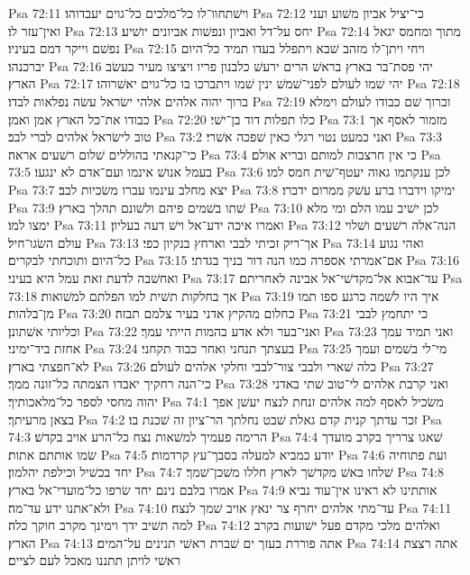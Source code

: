 Psa 72:11  וישׁתחוו־לו כל־מלכים כל־גוים יעבדוהו׃
Psa 72:12  כי־יציל אביון משׁוע ועני ואין־עזר לו׃
Psa 72:13  יחס על־דל ואביון ונפשׁות אביונים יושׁיע׃
Psa 72:14  מתוך ומחמס יגאל נפשׁם וייקר דמם בעיניו׃
Psa 72:15  ויחי ויתן־לו מזהב שׁבא ויתפלל בעדו תמיד כל־היום יברכנהו׃
Psa 72:16  יהי פסת־בר בארץ בראשׁ הרים ירעשׁ כלבנון פריו ויציצו מעיר כעשׂב הארץ׃
Psa 72:17  יהי שׁמו לעולם לפני־שׁמשׁ ינין שׁמו ויתברכו בו כל־גוים יאשׁרוהו׃
Psa 72:18  ברוך יהוה אלהים אלהי ישׂראל עשׂה נפלאות לבדו׃
Psa 72:19  וברוך שׁם כבודו לעולם וימלא כבודו את־כל הארץ אמן ואמן׃
Psa 72:20  כלו תפלות דוד בן־ישׁי׃
Psa 73:1  מזמור לאסף אך טוב לישׂראל אלהים לברי לבב׃
Psa 73:2  ואני כמעט נטוי רגלי כאין שׁפכה אשׁרי׃
Psa 73:3  כי־קנאתי בהוללים שׁלום רשׁעים אראה׃
Psa 73:4  כי אין חרצבות למותם ובריא אולם׃
Psa 73:5  בעמל אנושׁ אינמו ועם־אדם לא ינגעו׃
Psa 73:6  לכן ענקתמו גאוה יעטף־שׁית חמס למו׃
Psa 73:7  יצא מחלב עינמו עברו משׂכיות לבב׃
Psa 73:8  ימיקו וידברו ברע עשׁק ממרום ידברו׃
Psa 73:9  שׁתו בשׁמים פיהם ולשׁונם תהלך בארץ׃
Psa 73:10  לכן ישׁיב עמו הלם ומי מלא ימצו למו׃
Psa 73:11  ואמרו איכה ידע־אל וישׁ דעה בעליון׃
Psa 73:12  הנה־אלה רשׁעים ושׁלוי עולם השׂגו־חיל׃
Psa 73:13  אך־ריק זכיתי לבבי וארחץ בנקיון כפי׃
Psa 73:14  ואהי נגוע כל־היום ותוכחתי לבקרים׃
Psa 73:15  אם־אמרתי אספרה כמו הנה דור בניך בגדתי׃
Psa 73:16  ואחשׁבה לדעת זאת עמל היא בעיני׃
Psa 73:17  עד־אבוא אל־מקדשׁי־אל אבינה לאחריתם׃
Psa 73:18  אך בחלקות תשׁית למו הפלתם למשׁואות׃
Psa 73:19  איך היו לשׁמה כרגע ספו תמו מן־בלהות׃
Psa 73:20  כחלום מהקיץ אדני בעיר צלמם תבזה׃
Psa 73:21  כי יתחמץ לבבי וכליותי אשׁתונן׃
Psa 73:22  ואני־בער ולא אדע בהמות הייתי עמך׃
Psa 73:23  ואני תמיד עמך אחזת ביד־ימיני׃
Psa 73:24  בעצתך תנחני ואחר כבוד תקחני׃
Psa 73:25  מי־לי בשׁמים ועמך לא־חפצתי בארץ׃
Psa 73:26  כלה שׁארי ולבבי צור־לבבי וחלקי אלהים לעולם׃
Psa 73:27  כי־הנה רחקיך יאבדו הצמתה כל־זונה ממך׃
Psa 73:28  ואני קרבת אלהים לי־טוב שׁתי באדני יהוה מחסי לספר כל־מלאכותיך׃
Psa 74:1  משׂכיל לאסף למה אלהים זנחת לנצח יעשׁן אפך בצאן מרעיתך׃
Psa 74:2  זכר עדתך קנית קדם גאלת שׁבט נחלתך הר־ציון זה שׁכנת בו׃
Psa 74:3  הרימה פעמיך למשׁאות נצח כל־הרע אויב בקדשׁ׃
Psa 74:4  שׁאגו צרריך בקרב מועדך שׂמו אותתם אתות׃
Psa 74:5  יודע כמביא למעלה בסבך־עץ קרדמות׃
Psa 74:6  ועת פתוחיה יחד בכשׁיל וכילפת יהלמון׃
Psa 74:7  שׁלחו באשׁ מקדשׁך לארץ חללו משׁכן־שׁמך׃
Psa 74:8  אמרו בלבם נינם יחד שׂרפו כל־מועדי־אל בארץ׃
Psa 74:9  אותתינו לא ראינו אין־עוד נביא ולא־אתנו ידע עד־מה׃
Psa 74:10  עד־מתי אלהים יחרף צר ינאץ אויב שׁמך לנצח׃
Psa 74:11  למה תשׁיב ידך וימינך מקרב חוקך כלה׃
Psa 74:12  ואלהים מלכי מקדם פעל ישׁועות בקרב הארץ׃
Psa 74:13  אתה פוררת בעזך ים שׁברת ראשׁי תנינים על־המים׃
Psa 74:14  אתה רצצת ראשׁי לויתן תתננו מאכל לעם לציים׃
